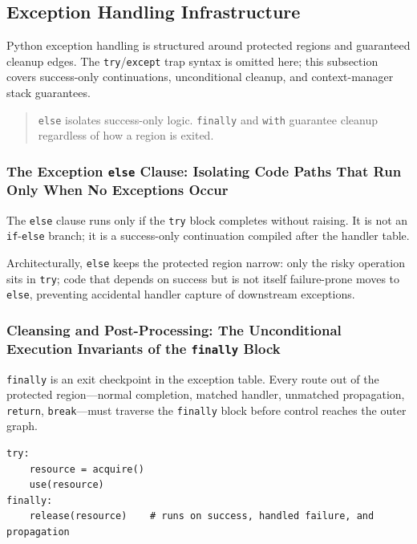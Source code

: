 \subsection{Exception Handling Infrastructure}

Python exception handling is structured around protected regions and guaranteed cleanup edges. The \texttt{try}/\texttt{except} trap syntax is omitted here; this subsection covers success-only continuations, unconditional cleanup, and context-manager stack guarantees.

\begin{quote}
\texttt{else} isolates success-only logic. \texttt{finally} and \texttt{with} guarantee cleanup regardless of how a region is exited.
\end{quote}

\subsubsection{The Exception \texttt{else} Clause: Isolating Code Paths That Run Only When No Exceptions Occur}

The \texttt{else} clause runs only if the \texttt{try} block completes without raising. It is not an \texttt{if}-\texttt{else} branch; it is a success-only continuation compiled after the handler table.

Architecturally, \texttt{else} keeps the protected region narrow: only the risky operation sits in \texttt{try}; code that depends on success but is not itself failure-prone moves to \texttt{else}, preventing accidental handler capture of downstream exceptions.

\subsubsection{Cleansing and Post-Processing: The Unconditional Execution Invariants of the \texttt{finally} Block}

\texttt{finally} is an exit checkpoint in the exception table. Every route out of the protected region---normal completion, matched handler, unmatched propagation, \texttt{return}, \texttt{break}---must traverse the \texttt{finally} block before control reaches the outer graph.

\begin{verbatim}
try:
    resource = acquire()
    use(resource)
finally:
    release(resource)    # runs on success, handled failure, and propagation
\end{verbatim}

